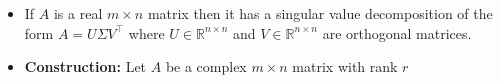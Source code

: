 \documentclass[11pt,twoside]{report}
\newcommand{\bbR}{{\mathbb{R}}}
\newcommand{\bbC}{{\mathbb{C}}}
\newcommand{\Id}{{\mathrm{I}}}
\newcommand{\Herm}{{\mathrm{H}}}
\begin{document}
\begin{itemize}
\item  If $A$ is a real $m \times n$ matrix then it has a singular value decomposition of the form $A = U \Sigma V^\top$ where $U \in \bbR^{n \times n}$ and $V \in \bbR^{n \times n}$ are orthogonal matrices. 










\item \textbf{Construction:} Let $A $ be a complex $m \times n$ matrix with rank $r$%



\end{itemize}
\end{document}
